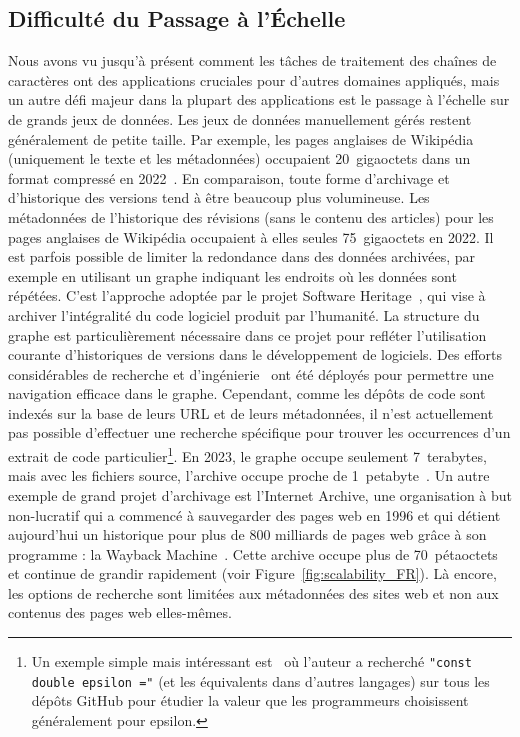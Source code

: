 \subsection*{Difficulté du Passage à l'Échelle}

Nous avons vu jusqu'à présent comment les tâches de traitement des chaînes de caractères ont des applications cruciales pour d'autres domaines appliqués, mais un autre défi majeur dans la plupart des applications est le passage à l'échelle sur de grands jeux de données.
Les jeux de données manuellement gérés restent généralement de petite taille. Par exemple, les pages anglaises de Wikipédia (uniquement le texte et les métadonnées) occupaient 20~gigaoctets dans un format compressé en 2022~\cite{wikimedia}. En comparaison, toute forme d'archivage et d'historique des versions tend à être beaucoup plus volumineuse. Les métadonnées de l'historique des révisions (sans le contenu des articles) pour les pages anglaises de Wikipédia occupaient à elles seules 75~gigaoctets en 2022.
Il est parfois possible de limiter la redondance dans des données archivées, par exemple en utilisant un graphe indiquant les endroits où les données sont répétées. C'est l'approche adoptée par le projet Software Heritage~\cite{swh-site}, qui vise à archiver l'intégralité du code logiciel produit par l'humanité. La structure du graphe est particulièrement nécessaire dans ce projet pour refléter l'utilisation courante d'historiques de versions dans le développement de logiciels.
Des efforts considérables de recherche et d'ingénierie~\cite{DBLP:phd/hal/Pietri21} ont été déployés pour permettre une navigation efficace dans le graphe. 
Cependant, comme les dépôts de code sont indexés sur la base de leurs URL et de leurs métadonnées, il n'est actuellement pas possible d'effectuer une recherche spécifique pour trouver les occurrences d'un extrait de code particulier\footnote{\setlength\parindent{10pt} Un exemple simple mais intéressant est~\cite{vii2014if} où l'auteur a recherché \texttt{"const double epsilon ="} (et les équivalents dans d'autres langages) sur tous les dépôts GitHub pour étudier la valeur que les programmeurs choisissent généralement pour epsilon.}.
En 2023, le graphe occupe seulement 7~terabytes, mais avec les fichiers source, l'archive occupe proche de 1~petabyte~\cite{swh-polytechnique}.
Un autre exemple de grand projet d'archivage est l'Internet Archive, une organisation à but non-lucratif qui a commencé à sauvegarder des pages web en 1996 et qui détient aujourd'hui un historique pour plus de 800 milliards de pages web grâce à son programme : la Wayback Machine~\cite{web-archive}. Cette archive occupe plus de 70~pétaoctets et continue de grandir rapidement (voir Figure~\ref{fig:scalability_FR}).
Là encore, les options de recherche sont limitées aux métadonnées des sites web et non aux contenus des pages web elles-mêmes.

